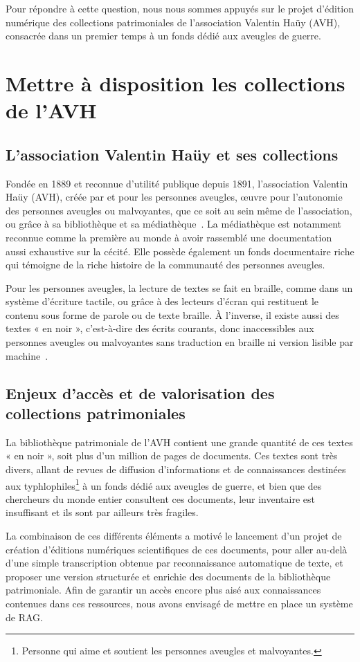 \documentclass[final, fra]{anthology-ch}     %
\begin{document}
Pour répondre à cette question, nous nous sommes appuyés sur le projet d’édition numérique des collections patrimoniales de l’association Valentin Haüy (AVH), consacrée dans un premier temps à un fonds dédié aux aveugles de guerre.

\section{Mettre à disposition les collections de l’AVH}
\subsection{L’association Valentin Haüy et ses collections}
Fondée en 1889 et reconnue d'utilité publique depuis 1891, l'association Valentin Haüy (AVH), créée par et pour les personnes aveugles, œuvre pour l'autonomie des personnes aveugles ou malvoyantes, que ce soit au sein même de l'association, ou grâce à sa bibliothèque et sa médiathèque~\cite{roy_avh_2019}. La médiathèque est notamment reconnue comme la première au monde à avoir rassemblé une documentation aussi exhaustive sur la cécité. Elle possède également un fonds documentaire riche qui témoigne de la riche histoire de la communauté des personnes aveugles.

Pour les personnes aveugles, la lecture de textes se fait en braille, comme dans un système d'écriture tactile, ou grâce à des lecteurs d'écran qui restituent le contenu sous forme de parole ou de texte braille. À l'inverse, il existe aussi des textes « en noir », c'est-à-dire des écrits courants, donc inaccessibles aux personnes aveugles ou malvoyantes sans traduction en braille ni version lisible par machine~\cite{roussel_avh_2023}. 

\subsection{Enjeux d’accès et de valorisation des collections patrimoniales}
La bibliothèque patrimoniale de l'AVH contient une grande quantité de ces textes « en noir », soit plus d'un million de pages de documents. Ces textes sont très divers, allant de revues de diffusion d'informations et de connaissances destinées aux typhlophiles\footnote{Personne qui aime et soutient les personnes aveugles et malvoyantes.} à un fonds dédié aux aveugles de guerre, et bien que des chercheurs du monde entier consultent ces documents, leur inventaire est insuffisant et ils sont par ailleurs très fragiles.

La combinaison de ces différents éléments a motivé le lancement d'un projet de création d'éditions numériques scientifiques de ces documents, pour aller au-delà d’une simple transcription obtenue par reconnaissance automatique de texte, et proposer une version structurée et enrichie des documents de la bibliothèque patrimoniale. Afin de garantir un accès encore plus aisé aux connaissances contenues dans ces ressources, nous avons envisagé de mettre en place un système de RAG.
\end{document}
